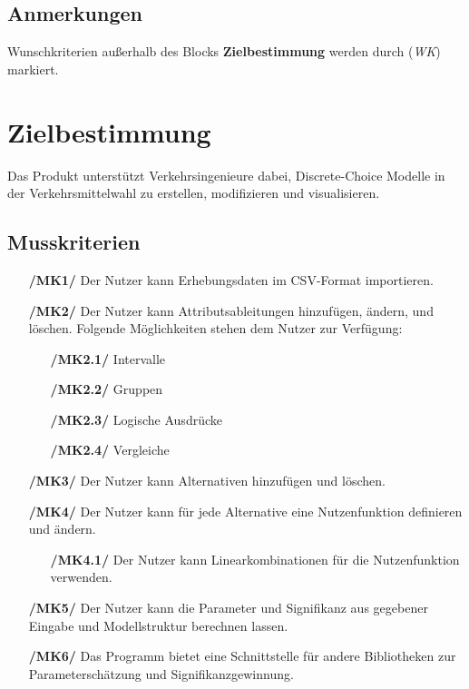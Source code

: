 \documentclass{article}
\begin{document}
\subsection{Anmerkungen}
Wunschkriterien außerhalb des Blocks \textbf{Zielbestimmung} werden durch (\textit{WK}) markiert.

\newpage
\section{Zielbestimmung}
Das Produkt unterstützt Verkehrsingenieure dabei, Discrete-Choice Modelle in der Verkehrsmittelwahl zu erstellen, modifizieren und visualisieren.
\subsection{Musskriterien}
\begin{itemize}
    \item[\textbf{/MK1/}] Der Nutzer kann Erhebungsdaten im CSV-Format importieren.
    \item[\textbf{/MK2/}] Der Nutzer kann Attributsableitungen hinzufügen, ändern, und löschen.
    \subitem Folgende Möglichkeiten stehen dem Nutzer zur Verfügung:
    \begin{itemize}[leftmargin=.7in]
        \item[\textbf{/MK2.1/}] Intervalle
        \item[\textbf{/MK2.2/}] Gruppen
        \item[\textbf{/MK2.3/}] Logische Ausdrücke
        \item[\textbf{/MK2.4/}] Vergleiche
    \end{itemize}
    \item[\textbf{/MK3/}] Der Nutzer kann Alternativen hinzufügen und löschen.
    \item[\textbf{/MK4/}] Der Nutzer kann für jede Alternative eine Nutzenfunktion definieren und ändern.
    \begin{itemize}[leftmargin=.7in]
        \item[\textbf{/MK4.1/}] Der Nutzer kann Linearkombinationen für die Nutzenfunktion verwenden.
    \end{itemize}
    \item[\textbf{/MK5/}] Der Nutzer kann die Parameter und Signifikanz aus gegebener Eingabe und Modellstruktur berechnen lassen.
    \item[\textbf{/MK6/}] Das Programm bietet eine Schnittstelle für andere Bibliotheken zur Parameterschätzung und Signifikanzgewinnung. 

\end{itemize}
\end{document}
